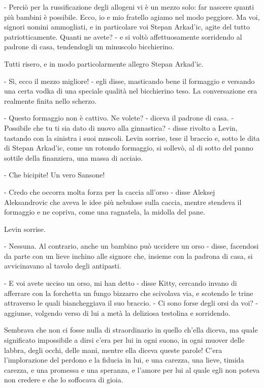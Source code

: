 - Perciò per la russificazione degli allogeni vi è un mezzo solo: far nascere quanti più bambini è possibile. Ecco, io e mio fratello agiamo nel modo peggiore. Ma voi, signori uomini ammogliati, e in particolare voi Stepan Arkad'ic, agite del tutto patriotticamente. Quanti ne avete? - e si voltò affettuosamente sorridendo al padrone di casa, tendendogli un minuscolo bicchierino. 

Tutti risero, e in modo particolarmente allegro Stepan Arkad'ic. 

- Sì, ecco il mezzo migliore! - egli disse, masticando bene il formaggio e versando una certa vodka di una speciale qualità nel bicchierino teso. La conversazione era realmente finita nello scherzo. 

- Questo formaggio non è cattivo. Ne volete? - diceva il padrone di casa. - Possibile che tu ti sia dato di nuovo alla ginnastica? - disse rivolto a Levin, tastando con la sinistra i suoi muscoli. Levin sorrise, tese il braccio e, sotto le dita di Stepan Arkad'ic, come un rotondo formaggio, si sollevò, al di sotto del panno sottile della finanziera, una massa di acciaio. 
\enlargethispage*{1\baselineskip}

- Che bicipite! Un vero Sansone! 

- Credo che occorra molta forza per la caccia all'orso - disse Aleksej Aleksandrovic che aveva le idee più nebulose sulla caccia, mentre stendeva il formaggio e ne copriva, come una ragnatela, la midolla del pane. 

Levin sorrise. 

- Nessuna. Al contrario, anche un bambino può uccidere un orso - disse, facendosi da parte con un lieve inchino alle signore che, insieme con la padrona di casa, si avvicinavano al tavolo degli antipasti. 

- E voi avete ucciso un orso, mi han detto - disse Kitty, cercando invano di afferrare con la forchetta un fungo bizzarro che scivolava via, e scotendo le trine attraverso le quali biancheggiava il suo braccio. - Ci sono forse degli orsi da voi? - aggiunse, volgendo verso di lui a metà la deliziosa testolina e sorridendo. 

Sembrava che non ci fosse nulla di straordinario in quello ch'ella diceva, ma quale significato impossibile a dirsi c'era per lui in ogni suono, in ogni muover delle labbra, degli occhi, delle mani, mentre ella diceva queste parole! C'era l'implorazione del perdono e la fiducia in lui, e una carezza, una lieve, timida carezza, e una promessa e una speranza, e l'amore per lui al quale egli non poteva non credere e che lo soffocava di gioia. 

